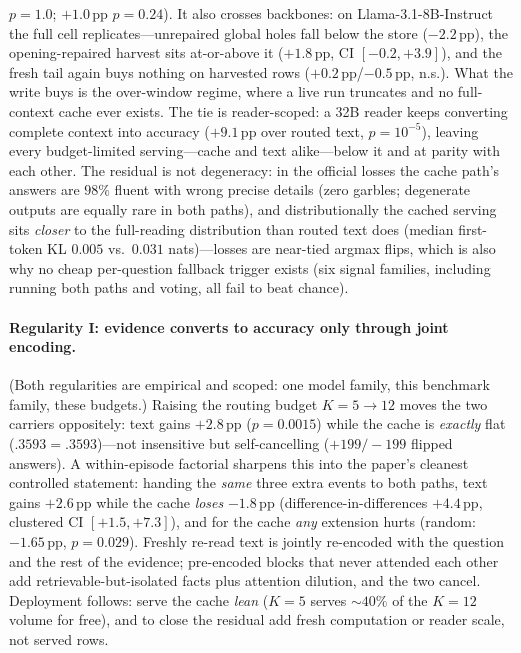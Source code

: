 \documentclass{article} %
\newcommand{\pp}{\,\mathrm{pp}}
\begin{document}
$p{=}1.0$; $+1.0\pp$ $p{=}0.24$). It also crosses backbones: on Llama-3.1-8B-Instruct
the full cell replicates---unrepaired global holes fall below the store ($-2.2\pp$),
the opening-repaired harvest sits at-or-above it ($+1.8\pp$, CI $[-0.2,+3.9]$), and the
fresh tail again buys nothing on harvested rows ($+0.2\pp$/$-0.5\pp$, n.s.).
What the write buys is the
over-window regime, where a live run truncates and no full-context cache ever exists. The
tie is reader-scoped: a 32B
reader keeps converting complete context into accuracy ($+9.1\pp$ over routed text,
$p{=}10^{-5}$), leaving every budget-limited serving---cache and text alike---below it and
at parity with each other. The residual is not degeneracy: in the official losses the cache
path's answers are $98\%$ fluent with wrong precise details (zero garbles; degenerate
outputs are equally rare in both paths), and distributionally the cached serving sits
\emph{closer} to the full-reading distribution than routed text does (median first-token
KL $0.005$ vs.\ $0.031$ nats)---losses are near-tied argmax flips, which is also why no
cheap per-question fallback trigger exists (six signal families, including running both
paths and voting, all fail to beat chance).

\paragraph{Regularity I: evidence converts to accuracy only through joint encoding.}
(Both regularities are empirical and scoped: one model family, this benchmark family,
these budgets.) Raising the
routing budget $K{=}5{\to}12$ moves the two carriers oppositely: text gains $+2.8\pp$
($p{=}0.0015$) while the cache is \emph{exactly} flat ($.3593{=}.3593$)---not insensitive
but self-cancelling ($+199/{-}199$ flipped answers). A within-episode factorial sharpens
this into the paper's cleanest controlled statement: handing the \emph{same} three extra
events to both paths, text gains $+2.6\pp$ while the cache \emph{loses} $-1.8\pp$
(difference-in-differences $+4.4\pp$, clustered CI $[+1.5,+7.3]$), and for the cache
\emph{any} extension hurts (random: $-1.65\pp$, $p{=}0.029$). Freshly re-read text is
jointly re-encoded with the question and the rest of the evidence; pre-encoded blocks that
never attended each other add retrievable-but-isolated facts plus attention dilution, and
the two cancel. Deployment follows: serve the cache \emph{lean} ($K{=}5$ serves ${\sim}40\%$
of the $K{=}12$ volume for free), and to close the residual add fresh computation or reader
scale, not served rows.
\end{document}
